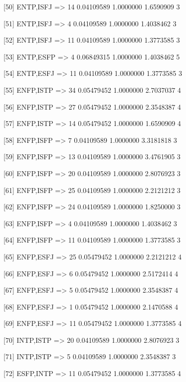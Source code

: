 [50]  {ENTP,ISFJ}           => {14} 0.04109589 1.0000000  1.6590909  3   

[51]  {ENTP,ISFJ}           => {4}  0.04109589 1.0000000  1.4038462  3   

[52]  {ENTP,ISFJ}           => {11} 0.04109589 1.0000000  1.3773585  3   

[53]  {ENTP,ESFP}           => {4}  0.06849315 1.0000000  1.4038462  5   

[54]  {ENTP,ESFJ}           => {11} 0.04109589 1.0000000  1.3773585  3   

[55]  {ENFP,ISTP}           => {34} 0.05479452 1.0000000  2.7037037  4   

[56]  {ENFP,ISTP}           => {27} 0.05479452 1.0000000  2.3548387  4   

[57]  {ENFP,ISTP}           => {14} 0.05479452 1.0000000  1.6590909  4   

[58]  {ENFP,ISFP}           => {7}  0.04109589 1.0000000  3.3181818  3   

[59]  {ENFP,ISFP}           => {13} 0.04109589 1.0000000  3.4761905  3   

[60]  {ENFP,ISFP}           => {20} 0.04109589 1.0000000  2.8076923  3   

[61]  {ENFP,ISFP}           => {25} 0.04109589 1.0000000  2.2121212  3   

[62]  {ENFP,ISFP}           => {24} 0.04109589 1.0000000  1.8250000  3   

[63]  {ENFP,ISFP}           => {4}  0.04109589 1.0000000  1.4038462  3   

[64]  {ENFP,ISFP}           => {11} 0.04109589 1.0000000  1.3773585  3   

[65]  {ENFP,ESFJ}           => {25} 0.05479452 1.0000000  2.2121212  4   

[66]  {ENFP,ESFJ}           => {6}  0.05479452 1.0000000  2.5172414  4   

[67]  {ENFP,ESFJ}           => {5}  0.05479452 1.0000000  2.3548387  4   

[68]  {ENFP,ESFJ}           => {1}  0.05479452 1.0000000  2.1470588  4   

[69]  {ENFP,ESFJ}           => {11} 0.05479452 1.0000000  1.3773585  4   

[70]  {INTP,ISTP}           => {20} 0.04109589 1.0000000  2.8076923  3   

[71]  {INTP,ISTP}           => {5}  0.04109589 1.0000000  2.3548387  3   

[72]  {ESFP,INTP}           => {11} 0.05479452 1.0000000  1.3773585  4   

